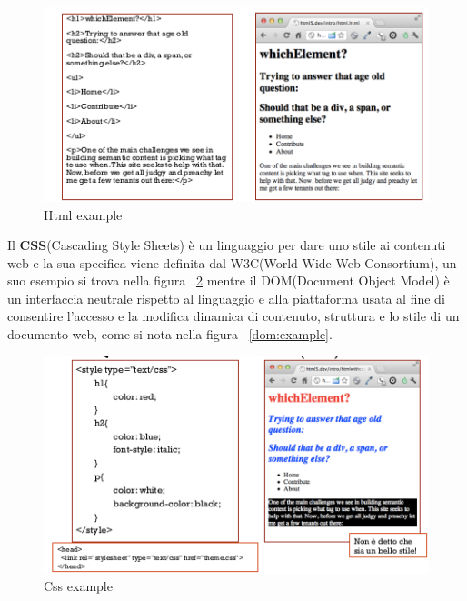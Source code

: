 \documentclass[a4paper,12pt, oneside]{book}
\begin{document}
\begin{figure}
    \caption{Html example}
    \label{listato:htmlExample}
	\includegraphics[scale=0.9]{img/html.png}
\end{figure}
Il \textbf{CSS}(Cascading Style Sheets) è un linguaggio per dare uno stile ai contenuti web e la sua specifica
viene definita dal W3C(World Wide Web Consortium), un suo esempio si trova nella figura ~\ref{css:example}
mentre il DOM(Document Object Model) è un interfaccia neutrale rispetto al linguaggio e alla piattaforma
usata al fine di consentire l'accesso e la modifica dinamica di contenuto, struttura e lo stile di un
documento web, come si nota nella figura ~\ref{dom:example}.

\begin{figure}
    \caption{Css example}
    \label{css:example}
	\includegraphics[scale=0.9]{img/css.png}
\end{figure}
\end{document}
